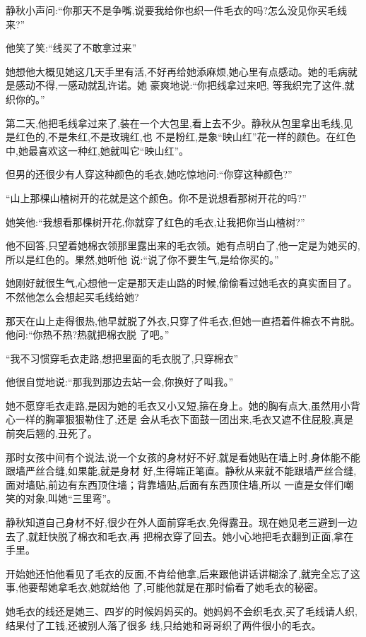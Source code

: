 ﻿\documentclass[12pt]{article}
\begin{document}
静秋小声问:``你那天不是争嘴,说要我给你也织一件毛衣的吗?怎么没见你买毛线来?''

他笑了笑:``线买了\myrule 不敢拿过来\myrule ''

她想他大概见她这几天手里有活,不好再给她添麻烦,她心里有点感动。她的毛病就是感动不得,一感动就乱许诺。她
豪爽地说:``你把线拿过来吧, 等我织完了这件,就织你的。''

第二天,他把毛线拿过来了,装在一个大包里,看上去不少。静秋从包里拿出毛线,见是红色的,不是朱红,不是玫瑰红,也
不是粉红,是象``映山红''花一样的颜色。在红色中,她最喜欢这一种红,她就叫它``映山红''。

但男的还很少有人穿这种颜色的毛衣,她吃惊地问:``你\myrule 穿这种颜色?''

``山上那棵山楂树开的花就是这个颜色。你不是说想看那树开花的吗?''

她笑他:``我想看那棵树开花,你就穿了红色的毛衣,让我把你当山楂树?''

他不回答,只望着她棉衣领那里露出来的毛衣领。她有点明白了,他一定是为她买的,所以是红色的。果然,她听他
说:``说了你不要生气\myrule ,是\myrule 给你买的\myrule 。''

她刚好就很生气,心想他一定是那天走山路的时候,偷偷看过她毛衣的真实面目了。不然他怎么会想起买毛线给她?

那天在山上走得很热,他早就脱了外衣,只穿了件毛衣,但她一直捂着件棉衣不肯脱。他问:``你热不热?热就把棉衣脱
了吧。''

``我\myrule 不习惯穿毛衣走路,想把里面的毛衣脱了,只穿棉衣\myrule ''

他很自觉地说:``那我到那边去站一会,你换好了叫我。''

她不愿穿毛衣走路,是因为她的毛衣又小又短,箍在身上。她的胸有点大,虽然用小背心一样的胸罩狠狠勒住了,还是
会从毛衣下面鼓一团出来,毛衣又遮不住屁股,真是前突后翘的,丑死了。

那时女孩中间有个说法,说一个女孩的身材好不好,就是看她贴在墙上时,身体能不能跟墙严丝合缝,如果能,就是身材
好,生得端正笔直。静秋从来就不能跟墙严丝合缝,面对墙贴,前边有东西顶住墙；背靠墙贴,后面有东西顶住墙,所以
一直是女伴们嘲笑的对象,叫她``三里弯''。

静秋知道自己身材不好,很少在外人面前穿毛衣,免得露丑。现在她见老三避到一边去了,就赶快脱了棉衣和毛衣,再
把棉衣穿了回去。她小心地把毛衣翻到正面,拿在手里。

开始她还怕他看见了毛衣的反面,不肯给他拿,后来跟他讲话讲糊涂了,就完全忘了这事,他要帮她拿毛衣,她就给他
了,可能他就是在那时偷看了她毛衣的秘密。

她毛衣的线还是她三、四岁的时候妈妈买的。她妈妈不会织毛衣,买了毛线请人织,结果付了工钱,还被别人落了很多
线,只给她和哥哥织了两件很小的毛衣。
\end{document}
